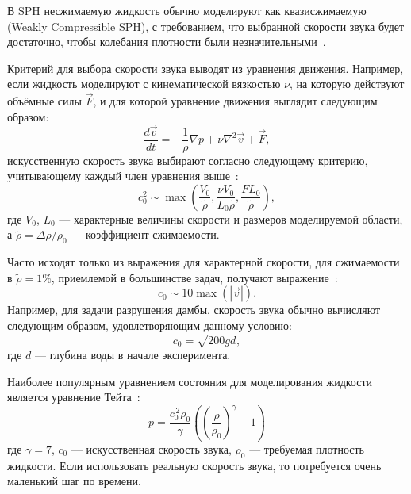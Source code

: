 В SPH несжимаемую жидкость обычно моделируют как квазисжимаемую (Weakly Compressible SPH), 
с требованием, что выбранной скорости звука будет достаточно, чтобы колебания плотности были незначительными~\cite{Monaghan2005}.
%

Критерий для выбора скорости звука выводят из уравнения движения. 
Например, если жидкость моделируют с кинематической вязкостью $\nu$, 
на которую действуют объёмные силы $\vec{F}$,
и для которой уравнение движения выглядит следующим образом:
%
\begin{equation}
    \frac{d\vec{v}}{d t} = -\frac{1}{\rho} \nabla p + \nu \nabla^2 \vec{v} + \vec{F},
\end{equation}
%
искусственную скорость звука выбирают согласно следующему критерию, учитывающему каждый член уравнения выше~\cite{Morris1997}:
%
\begin{equation}
    c_{0}^{2} \sim 
    \max\left(
        \frac{V_{0}}{\widetilde{\rho}}, 
        \frac{\nu V_{0}}{L_{0} \widetilde{\rho}},
        \frac{F L_{0}}{\widetilde{\rho}}
    \right),
\end{equation}
%
где $V_{0}$, $L_{0}$ --- характерные величины скорости и размеров моделируемой области, 
а $\widetilde{\rho} = \Delta\rho / \rho_{0}$ --- коэффициент сжимаемости.


Часто исходят только из выражения для характерной скорости, для сжимаемости в $\widetilde{\rho}=1\%$,
приемлемой в большинстве задач, получают выражение~\cite{Federico2012, Becker2007}:
%
\begin{equation} \label{eq:eos_c}
    c_{0} \sim 10 \max(|\vec{v}|).
\end{equation}
%
Например, для задачи разрушения дамбы, скорость звука обычно вычисляют следующим образом, удовлетворяющим данному условию: 
%
\begin{equation}
    c_{0} = \sqrt{200gd},
\end{equation}
%
где $d$ --- глубина воды в начале эксперимента.


Наиболее популярным уравнением состояния для моделирования жидкости является уравнение Тейта~\cite{Monaghan1994}:
%
\begin{equation}\label{eq:eos_tait}
    p = \frac{c_{0}^{\,2}\rho_{0}}{\gamma}\left( \left( \frac{\rho}{\rho_{0}} \right)^{\gamma} - 1 \right)
\end{equation}
%
где $\gamma = 7$, $c_{0}$ --- искусственная скорость звука, $\rho_{0}$ --- требуемая плотность жидкости. 
Если использовать реальную скорость звука, то потребуется очень маленький шаг по времени. 

